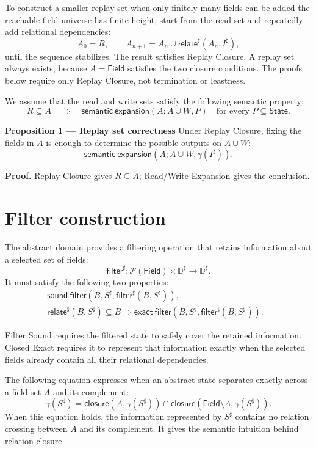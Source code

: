 \documentclass[10pt]{article}
\newcommand{\REV}[1]{{\color{reviewpink}#1}}
\newcommand{\boxheading}[1]{\textbf{#1}\quad}
\newcommand{\Field}{\mathsf{Field}}
\newcommand{\State}{\mathsf{State}}
\newcommand{\ProjClose}{\mathsf{closure}}
\newcommand{\filter}{\mathsf{filter}}
\newcommand{\relate}{\mathsf{relate}}
\newcommand{\SemanticExpand}{\mathsf{semantic\ expansion}}
\newcommand{\SoundFilter}{\mathsf{sound\ filter}}
\newcommand{\ExactFilter}{\mathsf{exact\ filter}}
\newcommand{\qedbox}{\hfill\raisebox{0.15ex}{\fboxsep=0pt\fbox{\rule{0pt}{0.55em}\rule{0.55em}{0pt}}}}
\providecommand{\DIFaddtex}[1]{{\protect\color{blue} #1}} %
\providecommand{\DIFdeltex}[1]{{\protect\color{red} \scriptsize #1}} %
\providecommand{\DIFaddbegin}{} %
\providecommand{\DIFaddend}{} %
\providecommand{\DIFdelbegin}{} %
\providecommand{\DIFdelend}{} %
\providecommand{\DIFadd}[1]{\texorpdfstring{\DIFaddtex{#1}}{#1}} %
\providecommand{\DIFdel}[1]{\texorpdfstring{\DIFdeltex{#1}}{}} %
\begin{document}
To construct a smaller replay set when \DIFdelbegin \DIFdel{only finitely many fields can be added}\DIFdelend \DIFaddbegin \DIFadd{the reachable field universe has finite height}\DIFaddend , start from
the read set and repeatedly add relational dependencies:
\[
  A_0=R,
  \qquad
  A_{n+1}=A_n\cup\relate^\sharp(A_n,I^\sharp),
\]
until the sequence stabilizes. The result satisfies Replay Closure. A replay set always exists,
because \(A=\Field\) satisfies the two closure conditions. The proofs below require only
Replay Closure, not termination or leastness.

\REV{We assume that the read and write sets satisfy the following semantic property:}
\[
  R\subseteq A
  \quad\Longrightarrow\quad
  \SemanticExpand(A;A\cup W,P)
  \quad\text{for every }P\subseteq\State.
  \tag{Read/Write Expansion}
\]

\begin{statementbox}
\boxheading{Proposition 1 --- Replay set correctness}
Under Replay Closure, fixing the fields in \(A\) is enough to determine the possible outputs on
\(A\cup W\):
\[
  \SemanticExpand(A;A\cup W,\gamma(I^\sharp)).
\]
\end{statementbox}

\textbf{Proof.}
Replay Closure gives \(R\subseteq A\); Read/Write Expansion gives the conclusion. \qedbox

\section{Filter construction}

The abstract domain provides a filtering operation that retains information about a selected set
of fields:
\[
  \filter^\sharp:
  \mathcal P(\Field)\times\mathbb D^\sharp\to\mathbb D^\sharp.
\]
It must satisfy the following two properties:
\begin{align*}
  &\SoundFilter\!\left(B,S^\sharp,\filter^\sharp(B,S^\sharp)\right),
  &&\tag{Filter Sound}\\
  &\relate^\sharp(B,S^\sharp)\subseteq B
  \Longrightarrow
  \ExactFilter\!\left(B,S^\sharp,\filter^\sharp(B,S^\sharp)\right).
  &&\tag{Closed Exact}
\end{align*}

Filter Sound requires the filtered state to safely cover the retained information. Closed Exact
requires it to represent that information exactly when the selected fields already contain all
their relational dependencies.

The following equation expresses when an abstract state separates exactly across a field set
\(A\) and its complement:
\[
  \gamma(S^\sharp)
  =
  \ProjClose\!\left(A,\gamma(S^\sharp)\right)
  \cap
  \ProjClose\!\left(\Field\setminus A,\gamma(S^\sharp)\right).
  \tag{Separation}
\]
When this equation holds, the information represented by \(S^\sharp\) contains no relation
crossing between \(A\) and its complement. It gives the semantic intuition behind relation
closure.
\end{document}
